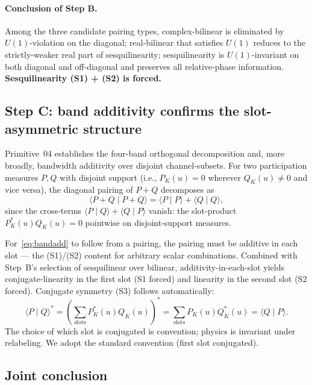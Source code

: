 \documentclass[11pt,a4paper]{article}
\begin{document}
\paragraph{Conclusion of Step B.} Among the three candidate pairing types, complex-bilinear is eliminated by $U(1)$-violation on the diagonal; real-bilinear that satisfies $U(1)$ reduces to the strictly-weaker real part of sesquilinearity; sesquilinearity is $U(1)$-invariant on both diagonal and off-diagonal and preserves all relative-phase information. \textbf{Sesquilinearity (S1) + (S2) is forced.}

\subsection{Step C: band additivity confirms the slot-asymmetric structure}

Primitive~04 establishes the four-band orthogonal decomposition and, more broadly, bandwidth additivity over disjoint channel-subsets. For two participation measures $P, Q$ with disjoint support (i.e., $P_K(u) = 0$ wherever $Q_K(u) \neq 0$ and vice versa), the diagonal pairing of $P + Q$ decomposes as
\begin{equation}
\langle P + Q \mid P + Q \rangle = \langle P \mid P \rangle + \langle Q \mid Q \rangle,
\label{eq:bandadd}
\end{equation}
since the cross-terms $\langle P \mid Q \rangle + \langle Q \mid P \rangle$ vanish: the slot-product $P_K^*(u) Q_K(u) = 0$ pointwise on disjoint-support measures.

For~\eqref{eq:bandadd} to follow from a pairing, the pairing must be additive in each slot --- the (S1)/(S2) content for arbitrary scalar combinations. Combined with Step~B's selection of sesquilinear over bilinear, additivity-in-each-slot yields conjugate-linearity in the first slot (S1 forced) and linearity in the second slot (S2 forced). Conjugate symmetry (S3) follows automatically:
\begin{equation}
\langle P \mid Q \rangle^* = \left( \sum_\text{slots} P_K^*(u) Q_K(u) \right)^* = \sum_\text{slots} P_K(u) Q_K^*(u) = \langle Q \mid P \rangle.
\label{eq:conjsym}
\end{equation}
The choice of which slot is conjugated is convention; physics is invariant under relabeling. We adopt the standard convention (first slot conjugated).

\subsection{Joint conclusion}
\end{document}
